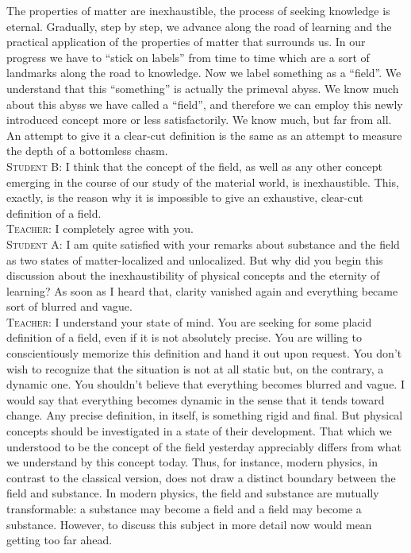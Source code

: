 \documentclass[a4paper,sfsidenotes]{tufte-book}
\begin{document}
The properties of matter are inexhaustible, the process of seeking knowledge is eternal. Gradually, step by step, we advance along the road of learning and the practical application of the properties of matter that surrounds us. In our progress we have to ``stick on labels'' from time to time which are a sort of landmarks along the road to knowledge. Now we label something as a ``field''. We understand that this ``something'' is actually the primeval abyss. We know much about this abyss we have called a ``field'', and therefore we can employ this newly introduced concept more or less satisfactorily. We know much, but far from all. An attempt to give it a clear-cut definition is the same as an attempt to measure the depth of a bottomless chasm.
\\
\textsc{Student B:} I think that the concept of the field, as well as any other concept emerging in the course of our study of the material world, is inexhaustible. This, exactly, is the reason why it is impossible to give an exhaustive, clear-cut definition of a field.
\\
\textsc{Teacher:} I completely agree with you.
\\
\textsc{Student A:} I am quite satisfied with your remarks about substance and the field as two states of matter-localized and unlocalized. But why did you begin this discussion about the inexhaustibility of physical concepts and the eternity of learning? As soon as I heard that, clarity vanished again and everything became sort of blurred and vague.
\\
\textsc{Teacher:} I understand your state of mind. You are seeking for some placid definition of a field, even if it is not absolutely precise. You are willing to conscientiously memorize this definition and hand it out upon request. You don't wish to recognize that the situation is not at all static but, on the contrary, a dynamic one. You shouldn't believe that everything becomes blurred and vague. I would say that everything becomes dynamic in the sense that it tends toward change. Any precise definition, in itself, is something rigid and final. But physical concepts should be investigated in a state of their development. That which we understood to be the concept of the field yesterday appreciably differs from what we understand by this concept today. Thus, for instance, modern physics, in contrast to the classical version, does not draw a distinct boundary between the field and substance. In modern physics, the field and substance are mutually transformable: a substance may become a field and a field may become a substance. However, to discuss this subject in more detail now would mean getting too far ahead.
\end{document}
